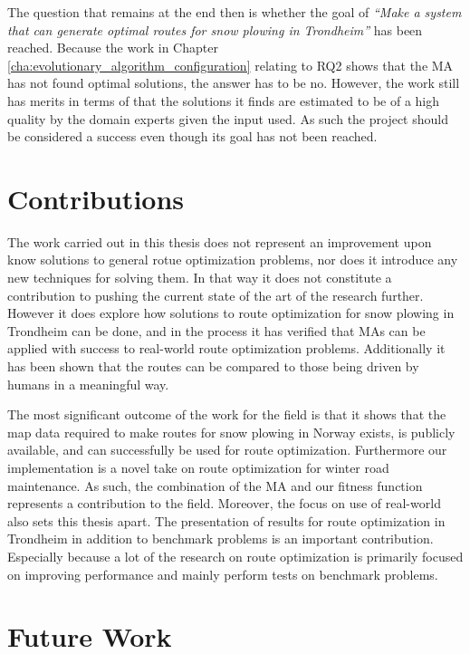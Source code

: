 The question that remains at the end then is whether the goal of \emph{\enquote{Make a system that can generate optimal routes for snow plowing in Trondheim}} has been reached. Because the work in Chapter \ref{cha:evolutionary_algorithm_configuration} relating to RQ2 shows that the MA has not found optimal solutions, the answer has to be no. However, the work still has merits in terms of that the solutions it finds are estimated to be of a high quality by the domain experts given the input used. As such the project should be considered a success even though its goal has not been reached.


\section{Contributions}

The work carried out in this thesis does not represent an improvement upon know solutions to general rotue optimization problems, nor does it introduce any new techniques for solving them. In that way it does not constitute a contribution to pushing the current state of the art of the research further. However it does explore how solutions to route optimization for snow plowing in Trondheim can be done, and in the process it has verified that MAs can be applied with success to real-world route optimization problems. Additionally it has been shown that the routes can be compared to those being driven by humans in a meaningful way.

The most significant outcome of the work for the field is that it shows that the map data required to make routes for snow plowing in Norway exists, is publicly available, and can successfully be used for route optimization. Furthermore our implementation is a novel take on route optimization for winter road maintenance. As such, the combination of the MA and our fitness function represents a contribution to the field. Moreover, the focus on use of real-world also sets this thesis apart. The presentation of results for route optimization in Trondheim in addition to benchmark problems is an important contribution. Especially because a lot of the research on route optimization is primarily focused on improving performance and mainly perform tests on benchmark problems.

\section{Future Work}

